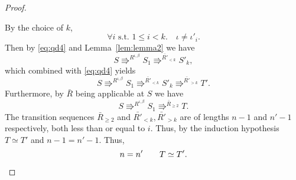 \begin{proof}
\begin{description}
%

      By the choice of $k$,
      \begin{equation*}
        \forall i \text{ s.t. } 1 \leq i < k. \quad \iota \neq \iota'_i.
      \end{equation*}
      Then by \eqref{eq:qd4} and Lemma~\ref{lem:lemma2} we have
      \begin{equation*}
        S \Rrightarrow^{{R}^{\iota, \beta}} S_1 \Rrightarrow^{\bar{R'}_{<k}}
        S'_k,
      \end{equation*}
      which combined with \eqref{eq:qd4} yields
      \begin{equation*}
        S \Rrightarrow^{{R}^{\iota, \beta}} S_1 \Rrightarrow^{\bar{R'}_{<k}}
        S'_k \Rrightarrow^{\bar{R'}_{>k}} T'.
      \end{equation*}
      Furthermore, by $\bar{R}$ being applicable at $S$ we have
      \begin{equation*}
        S \Rrightarrow^{R^{\iota, \beta}} S_1 \Rrightarrow^{\bar{R}_{\geq 2}}
        T.
      \end{equation*}
      The transition sequences $\bar{R}_{\geq 2}$ and $\bar{R'}_{<k},
      \bar{R'}_{>k}$ are of lengths $n - 1$ and $n' - 1$ respectively, both less
      than or equal to $i$.  Thus, by the induction hypothesis $T \simeq T'$ and
      $n - 1 = n' - 1$. Thus,
      \begin{equation*}
        n = n' \quad\quad T \simeq T'.
      \end{equation*}
  \end{description}
\end{proof}





